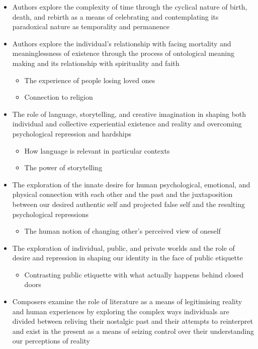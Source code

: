 	\begin{itemize}
		\item Authors explore the complexity of time through the cyclical nature of birth, death, and rebirth as a means of celebrating and contemplating its paradoxical nature as temporality and permanence

		\item Authors explore the individual's relationship with facing mortality and meaninglessness of existence through the process of ontological meaning making and its relationship with spirituality and faith
			\begin{itemize}
				\item The experience of people losing loved ones
				\item Connection to religion
			\end{itemize}

		\item The role of language, storytelling, and creative imagination in shaping both individual and collective experiential existence and reality and overcoming psychological repression and hardships
			\begin{itemize}
				\item How language is relevant in particular contexts
				\item The power of storytelling
			\end{itemize}

		\item The exploration of the innate desire for human psychological, emotional, and physical connection with each other and the past and the juxtaposition between our desired authentic self and projected false self and the resulting psychological repressions
			\begin{itemize}
				\item The human notion of changing other's perceived view of oneself
			\end{itemize}

		\item The exploration of individual, public, and private worlds and the role of desire and repression in shaping our identity in the face of public etiquette
			\begin{itemize}
				\item Contrasting public etiquette with what actually happens behind closed doors
			\end{itemize}
			
		\item Composers examine the role of literature as a means of legitimising reality and human experiences by exploring the complex ways individuals are divided between reliving their nostalgic past and their attempts to reinterpret and exist in the present as a means of seizing control over their understanding our perceptions of reality
	\end{itemize}

